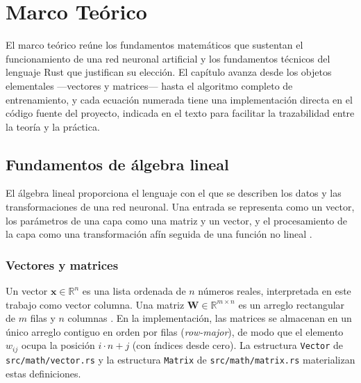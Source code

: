 \chapter{Marco Teórico}\label{cap:marco}
El marco teórico reúne los fundamentos matemáticos que sustentan el funcionamiento de una red neuronal artificial y los fundamentos técnicos del lenguaje Rust que justifican su elección. El capítulo avanza desde los objetos elementales ---vectores y matrices--- hasta el algoritmo completo de entrenamiento, y cada ecuación numerada tiene una implementación directa en el código fuente del proyecto, indicada en el texto para facilitar la trazabilidad entre la teoría y la práctica.

\section{Fundamentos de álgebra lineal}
El álgebra lineal proporciona el lenguaje con el que se describen los datos y las transformaciones de una red neuronal. Una entrada se representa como un vector, los parámetros de una capa como una matriz y un vector, y el procesamiento de la capa como una transformación afín seguida de una función no lineal \citep{strang2016,deisenroth2020}.

\subsection{Vectores y matrices}
Un vector $\mathbf{x}\in\mathbb{R}^{n}$ es una lista ordenada de $n$ números reales, interpretada en este trabajo como vector columna. Una matriz $\mathbf{W}\in\mathbb{R}^{m\times n}$ es un arreglo rectangular de $m$ filas y $n$ columnas \citep{strang2016}. En la implementación, las matrices se almacenan en un único arreglo contiguo en orden por filas (\emph{row-major}), de modo que el elemento $w_{ij}$ ocupa la posición $i\cdot n + j$ (con índices desde cero). La estructura \texttt{Vector} de \texttt{src/math/vector.rs} y la estructura \texttt{Matrix} de \texttt{src/math/matrix.rs} materializan estas definiciones.

